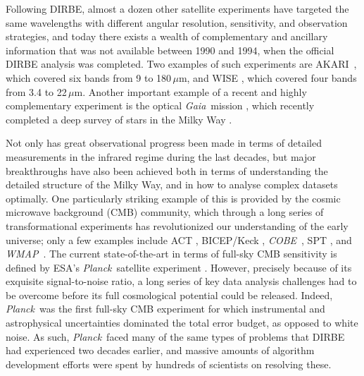 \documentclass{aa}
\def\Planck{\textit{Planck}}
\def\WMAP{\textit{WMAP}}
\def\COBE{\textit{COBE}}
\def\GAIA{\textit{Gaia}}
\def\AKARI{\textrm{{AKARI}}}
\begin{document}
Following DIRBE, almost a dozen other satellite experiments have targeted the same wavelengths with different angular resolution, sensitivity, and observation strategies, and today there exists a wealth of complementary and ancillary information that was not available between 1990 and 1994, when the official DIRBE analysis was completed. Two examples of such experiments are \AKARI\ \citep{murakami:2007}, which covered six bands from 9 to 180\,$\mu$m, and WISE \citep{wright:2010}, which covered four bands from 3.4 to 22\,$\mu$m. Another important example of a recent and highly complementary experiment is the optical \GAIA\ mission \citep{gaia:2016}, which recently completed a deep survey of stars in the Milky Way \citep{gaia:2018}.

Not only has great observational progress been made in terms of detailed measurements in the infrared regime during the last decades, but major breakthroughs have also been achieved both in terms of understanding the detailed structure of the Milky Way, and in how to analyse complex datasets optimally. One particularly striking example of this is provided by the cosmic microwave background (CMB) community, which through a long series of transformational experiments has revolutionized our understanding of the early universe; only a few examples include ACT \citep{fowler:2007}, BICEP/Keck \citep{2014ApJ...792...62B}, \COBE\ \citep{mather:1994}, SPT \citep{carlstrom:2011}, and \WMAP\ \citep{bennett2012}. The current state-of-the-art in terms of full-sky CMB sensitivity is defined by ESA's \Planck\ satellite experiment \citep{planck2016-l01}. However, precisely because of its exquisite signal-to-noise ratio, a long series of key data analysis challenges had to be overcome before its full cosmological potential could be released. Indeed, \Planck\ was the first full-sky CMB experiment for which instrumental and astrophysical uncertainties dominated the total error budget, as opposed to white noise. As such, \Planck\ faced many of the same types of problems that DIRBE had experienced two decades earlier, and massive amounts of algorithm development efforts were spent by hundreds of scientists on resolving these.
\end{document}
